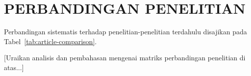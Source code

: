 \section{PERBANDINGAN PENELITIAN}
\label{sec:perbandingan}

Perbandingan sistematis terhadap penelitian-penelitian terdahulu disajikan pada Tabel~\ref{tab:article-comparison}.



[Uraikan analisis dan pembahasan mengenai matriks perbandingan penelitian di atas...]
